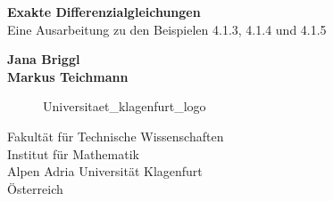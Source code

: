 \begin{titlepage}
    \begin{center}
        \vspace*{1cm}
        \Huge
        \textbf{Exakte Differenzialgleichungen}\\
        \LARGE
        \vspace{0.5cm}
        Eine Ausarbeitung zu den Beispielen 4.1.3, 
        4.1.4 und 4.1.5  

        \vspace{1.5cm}
        \textbf{Jana Briggl \vspace{-1.1cm} \\ \hspace{2.75cm} \footnotesize \footnotemark}
        \newline
        \textbf{Markus Teichmann \vspace{-1.1cm} \\ \hspace{4.5cm} \footnotesize \footnotemark}

        \Large

        \vspace{3cm}

        \begin{figure}[htp]
            \centering
            {Universitaet_klagenfurt_logo}
        \end{figure}
        Fakultät für Technische Wissenschaften\\
        Institut für Mathematik\\
        Alpen Adria Universität Klagenfurt\\
        Österreich\\
        \datumVonHeute

    \end{center}
\end{titlepage}
